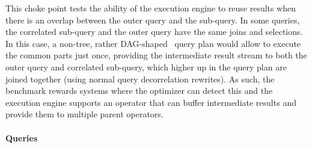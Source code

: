 
This choke point tests the ability of the execution engine to reuse results when
there is an overlap between the outer query and the sub-query. In some queries,
the correlated sub-query and the outer query have the same joins and selections.
In this case, a non-tree, rather DAG-shaped~\cite{DBLP:conf/btw/NeumannM09}
query plan would allow to execute the common parts just once, providing the
intermediate result stream to both the outer query and correlated sub-query,
which higher up in the query plan are joined together (using normal query
decorrelation rewrites). As such, the benchmark rewards systems where the
optimizer can detect this and the execution engine supports an operator that can
buffer intermediate results and provide them to multiple parent operators.


\paragraph{Queries}
{\raggedright
}
